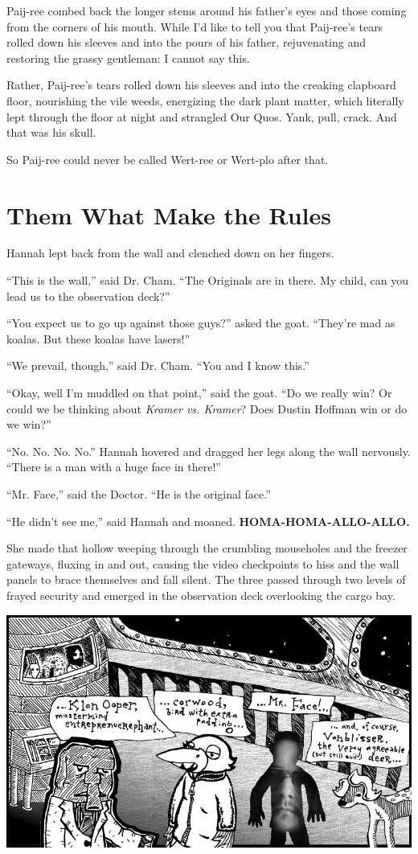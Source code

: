 \documentclass[10pt,twoside]{report}
\begin{document}
Paij-ree combed back the longer stems around his father's eyes and
those coming from the corners of his mouth.  While I'd like to tell
you that Paij-ree's tears rolled down his sleeves and into the pours
of his father, rejuvenating and restoring the grassy gentleman: I
cannot say this.

Rather, Paij-ree's tears rolled down his sleeves and into the creaking
clapboard floor, nourishing the vile weeds, energizing the dark plant
matter, which literally lept through the floor at night and strangled
Our Quos.  Yank, pull, crack.  And that was his skull.

So Paij-ree could never be called Wert-ree or Wert-plo after that.


\section{Them What Make the Rules}


Hannah lept back from the wall and clenched down on her fingers.

``This is the wall,'' said Dr. Cham.  ``The Originals are in there.
My child, can you lead us to the observation deck?''

``You expect us to go up against those guys?'' asked the goat.
``They're mad as koalas.  But these koalas have lasers!''

``We prevail, though,'' said Dr. Cham.  ``You and I know this.''

``Okay, well I'm muddled on that point,'' said the goat.  ``Do we
really win? Or could we be thinking about {\em Kramer vs. Kramer}?
Does Dustin Hoffman win or do we win?''

``No.  No.  No.  No.''  Hannah hovered and dragged her legs along the
wall nervously. ``There is a man with a huge face in there!''

``Mr. Face,'' said the Doctor.  ``He is the original face.''

``He didn't see me,'' said Hannah and moaned.  {\bf
  HOMA-HOMA-ALLO-ALLO.}

She made that hollow weeping through the crumbling mouseholes and the
freezer gateways, fluxing in and out, causing the video checkpoints to
hiss and the wall panels to brace themselves and fall silent.  The
three passed through two levels of frayed security and emerged in the
observation deck overlooking the cargo bay.

	\includegraphics[width=1.0\textwidth]{cache/51.png}
\end{document}
